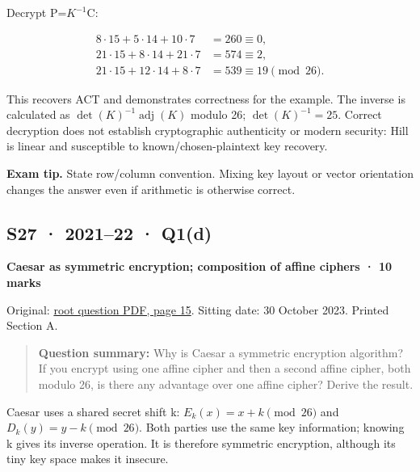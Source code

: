 \documentclass[11pt,a4paper]{article}
\begin{document}
Decrypt P=\allowbreak{}\(K^{-1}\)C:



\[
\begin{aligned}8\cdot15+5\cdot14+10\cdot7&=260\equiv0,\\21\cdot15+8\cdot14+21\cdot7&=574\equiv2,\\21\cdot15+12\cdot14+8\cdot7&=539\equiv19\pmod{26}.\end{aligned}
\]

This recovers ACT and demonstrates correctness for the example. The inverse is calculated as \(\det(K)^{-1}\operatorname{adj}(K)\) modulo 26; \(\det(K)^{-1}=25\). Correct decryption does not establish cryptographic authenticity or modern security: Hill is linear and susceptible to known/\allowbreak{}chosen-plaintext key recovery.



{\color{ForestGreen}\textbf{Exam tip.} State row/\allowbreak{}column convention. Mixing key layout or vector orientation changes the answer even if arithmetic is otherwise correct.}




\clearpage
\subsection{S27 · 2021–22 · Q1(d)}\label{s27}

\textbf{Caesar as symmetric encryption; composition of affine ciphers · 10 marks}


Original: \href{../../CSE405-Security_Merged.pdf\#page=15}{root question PDF,\allowbreak{} page 15}. Sitting date: 30 October 2023. Printed Section A.



\begin{quote}\small

\textbf{Question summary:} Why is Caesar a symmetric encryption algorithm? If you encrypt using one affine cipher and then a second affine cipher,\allowbreak{} both modulo 26,\allowbreak{} is there any advantage over one affine cipher? Derive the result.



\end{quote}

Caesar uses a shared secret shift k: \(E_k(x)=x+k\pmod{26}\) and \(D_k(y)=y-k\pmod{26}\). Both parties use the same key information; knowing k gives its inverse operation. It is therefore symmetric encryption,\allowbreak{} although its tiny key space makes it insecure.
\end{document}
